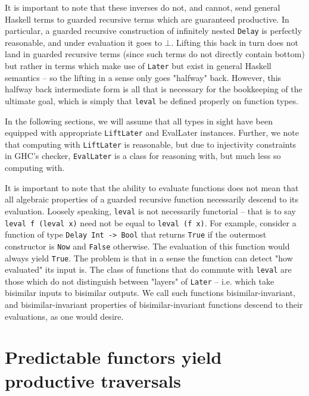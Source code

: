 \documentclass[hoptionsi,review,format=sigplan]{acmart}
\newcommand{\hs}{\texttt}
\newcommand{\hsn}{\texttt}
\begin{document}
It is important to note that these inverses do not, and cannot, send general Haskell terms to guarded recursive terms which are guaranteed productive. In particular, a guarded recursive construction of infinitely nested \hs{Delay} is perfectly reasonable, and under evaluation it goes to $\bot$. Lifting this back in turn does not land in guarded recursive terms (since such terms do not directly contain bottom) but rather in terms which make use of \hs{Later} but exist in general Haskell semantics -- so the lifting in a sense only goes "halfway" back. However, this halfway back intermediate form is all that is necessary for the bookkeeping of the ultimate goal, which is simply that \hs{leval} be defined properly on function types.

In the following sections, we will assume that all types in sight have been equipped with appropriate \hs{LiftLater} and {EvalLater} instances. Further, we note that computing with \hs{LiftLater} is reasonable, but due to injectivity constraints in GHC's checker, \hs{EvalLater} is a class for reasoning with, but much less so computing with.

It is important to note that the ability to evaluate functions does not mean that all algebraic properties of a guarded recursive function necessarily descend to its evaluation. Loosely speaking, \hs{leval} is not necessarily functorial -- that is to say \hsn{leval f (leval x)} need not be equal to \hsn{leval (f x)}. For example, consider a function of type \hs{Delay Int -> Bool} that returns \hs{True} if the outermost constructor is \hs{Now} and \hs{False} otherwise. The evaluation of this function would always yield \hs{True}. The problem is that in a sense the function can detect "how evaluated" its input is. The class of functions that do commute with \hs{leval} are those which do not distinguish between "layers" of \hs{Later} -- i.e. which take bisimilar inputs to bisimilar outputs. We call such functions bisimilar-invariant, and  bisimilar-invariant properties of bisimilar-invariant functions descend to their evaluations, as one would desire.


\section{Predictable functors yield productive traversals}
\end{document}
